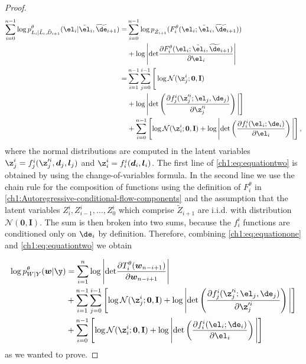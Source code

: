 \begin{proof}
    \begin{equation}\label{ch1:eq:equationtwo}
    \begin{aligned}
        \sum_{i=0}^{n-1}\log{p_{L_i|\tilde{L}_{i},\tilde D_{i+1}}^\theta(\el_i|\tilde{\el}_{i},\widetilde \de_{i+1})}
         =& \sum_{i=0}^{n-1}\log{p_{\tilde{Z}_{i+1}}(F_i^{\theta}(\el_i;\tilde{\el}_{i},\widetilde \de_{i+1}))}\\
         &  +\log{\Bigg|\text{det}\frac{\partial F_i^{\theta}(\el_i;\tilde{\el}_{i},\widetilde \de_{i+1})}{\partial \el_i}\Bigg|} \\
        =& \sum_{i=1}^{n-1} \sum^{i-1}_{j=0} \Bigg[\log \mathcal{N}(\z_j^i;\textbf{0},\textbf{I})\\
        &  +\log \Bigg|\text{det}\left(\frac{\partial f^i_{j}(\z_j^{\prime i};\el_j,\de_{j})}{\partial \z_j^{\prime i}}\right)\Bigg|\Bigg] \\
    & + \sum_{i=0}^{n-1}  \left[\log \mathcal{N}(\z_i^i;\textbf{0},\textbf{I})+\log \Bigg|\text{det}\left(\frac{\partial f^i_{i}(\el_{i};\de_{i})}{\partial \el_{i}}\right)\Bigg|\right],
    \end{aligned}
    \end{equation}
    where the normal distributions are computed in the latent variables $\z_j^i = f_j^i(\z_j^{\prime i}, \boldsymbol{d}_j,\boldsymbol{l}_j)$ and $\z_i^i = f_i^i( \boldsymbol{d}_i,\boldsymbol{l}_i)$.
    The first line of \eqref{ch1:eq:equationtwo} is obtained by using the change-of-variables formula. In the second line we use the chain rule for the composition of functions using the definition of $F_{i}^{\theta}$ in \ref{ch1:Autoregressive-conditional-flow-components} and the assumption that the latent variables $Z_i^i,Z_{i-1}^i, ..., Z_0^i$ which comprise $\tilde{Z}_{i+1}$ are i.i.d. with distribution $\mathcal{N}(\textbf{0},\textbf{I})$. The sum is then broken into two sums, because the $f_i^i$ functions are conditioned only on $\de_i$ by definition. Therefore, combining \eqref{ch1:eq:equationone} and \eqref{ch1:eq:equationtwo} we obtain
    
    \begin{align}
    \log p^\theta_{W|Y}(\boldsymbol{w} | \y)   & = \sum_{i=1}^{n}\log{\Bigg|\text{det}\frac{\partial T_i^{\theta}(\boldsymbol{w}_{n-i+1})}{\partial \boldsymbol{w}_{n-i+1}}\Bigg|} \nonumber \\ 
    & + \sum_{i=1}^{n-1} \sum^{i-1}_{j=0} \left[\log \mathcal{N}(\z_j^i;\textbf{0},\textbf{I})+\log \Bigg|\text{det}\left(\frac{\partial f^i_{j}(\z_j^{\prime i};\el_j,\de_{j})}{\partial \z_j^{\prime i}}\right)\Bigg|\right] \nonumber\\
    & + \sum_{i=0}^{n-1}  \left[\log \mathcal{N}(\z_i^i;\textbf{0},\textbf{I})+\log \Bigg|\text{det}\left(\frac{\partial f^i_{i}(\el_{i};\de_{i})}{\partial \el_{i}}\right)\Bigg|\right] \nonumber
    \end{align} 
    as we wanted to prove.
    
\end{proof}


